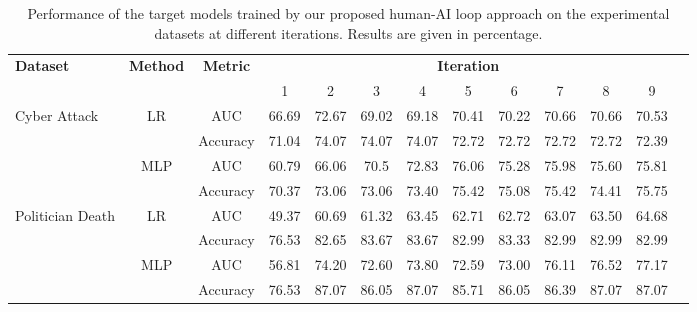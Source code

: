 \documentclass[letterpaper]{article}
\begin{document}
\begin{table}[btp]
\centering
\caption{Performance of the target models trained by our proposed human-AI loop approach on the experimental datasets at different iterations. Results are given in percentage. }
\label{tab:res}
\begin{tabular}{lcccccccccccc}
\toprule
\multicolumn{1}{l}{\multirow{2}{*}{\textbf{Dataset}}} & \multicolumn{1}{l}{\multirow{2}{*}{\textbf{Method}}} & \multirow{2}{*}{\textbf{Metric}} & \multicolumn{9}{c}{\textbf{Iteration}}                                         \\ \cline{4-12} 
\multicolumn{1}{c}{} & \multicolumn{1}{c}{} & & 1     & 2     & 3     & 4     & 5     & 6     & 7     & 8     & 9     \\ \midrule
\multirow{4}{*}{Cyber Attack}                & \multirow{2}{*}{LR}                         
& AUC       & 66.69 & 72.67 & 69.02 & 69.18 & 70.41 & 70.22 & 70.66 & 70.66 &  70.53 \\ %
& 
& Accuracy  & 71.04 & 74.07 & 74.07 & 74.07 & 72.72 & 72.72 & 72.72 & 72.72 & 72.39  \\ \cline{2-12} 
                                             & \multirow{2}{*}{MLP}                        
& AUC       & 60.79 & 66.06 & 70.5 & 72.83 & 76.06 & 75.28 & 75.98 & 75.60 & 75.81      \\ %
                                             &                                             
& Accuracy  & 70.37 & 73.06 & 73.06 & 73.40  & 75.42 & 75.08 & 75.42 & 74.41 & 75.75  \\ \hline
\multirow{4}{*}{Politician Death}           & \multirow{2}{*}{LR} 
& AUC    & 49.37 & 60.69 & 61.32 & 63.45 & 62.71 & 62.72 & 63.07 & 63.50  & 64.68 \\ %
&  
& Accuracy  & 76.53 & 82.65 & 83.67 & 83.67 & 82.99 & 83.33 & 82.99 & 82.99 & 82.99  \\ \cline{2-12} 

                                             & \multirow{2}{*}{MLP}                        
& AUC       & 56.81 & 74.20 & 72.60 & 73.80 & 72.59 & 73.00 & 76.11  & 76.52 & 77.17   \\ %
                                             &                                             
& Accuracy  & 76.53 & 87.07 & 86.05 & 87.07  & 85.71 & 86.05 & 86.39 & 87.07 & 87.07    \\ \bottomrule
\end{tabular}
\end{table}
\end{document}

